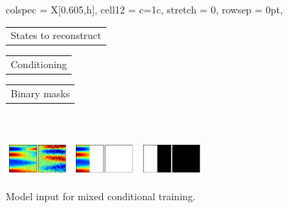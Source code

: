 \documentclass{article}
\begin{document}
\begin{figure}[t]
\newcommand{\myheight}{13mm}
\centering
\begin{tblr}{
  colspec = {X[0.605,h]},
  cell{1}{2} = {c=1}{c}, %
  stretch = 0,
  rowsep = 0pt,
}
\hspace{-3mm} \begin{tabular}{c} \small States to reconstruct\end{tabular} \hspace{2mm} \begin{tabular}{c} \small Conditioning\end{tabular} \hspace{2mm} \begin{tabular}{c} \small Binary masks\end{tabular} \\
\vspace{-15mm}
\\
\includegraphics[height=\myheight,trim={2mm 2mm 2mm 2mm},clip]{img/diff_cases/model_inputs_flat_state.pdf}
\includegraphics[height=\myheight,trim={2mm 2mm 2mm 2mm},clip]{img/diff_cases/model_inputs_flat_cond.pdf}
\includegraphics[height=\myheight,trim={2mm 2mm 2mm 2mm},clip]{img/diff_cases/model_inputs_flat_mask.pdf}

\end{tblr}
\caption{Model input for mixed conditional training.
}
\label{f:model_input}
\end{figure}
\end{document}
